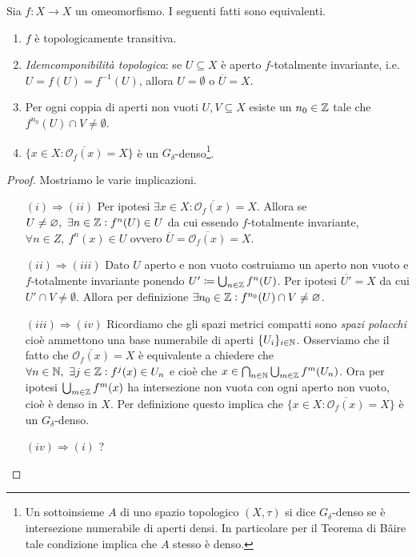 \begin{theorem}
	Sia $ f \colon X \to X $ un omeomorfismo. I seguenti fatti sono equivalenti.
	\begin{enumerate}[label=(\roman*)]
		\item $ f $ è topologicamente transitiva.
		\item \emph{Idemcomponibilità topologica}: se $ U \subseteq X $ è aperto $ f $-totalmente invariante, i.e. $ U = f(U) = f^{-1}(U) $, allora $ U = \emptyset $ o $ \overline{U} = X $.
		\item Per ogni coppia di aperti non vuoti $ U, V \subseteq X $ esiste un $ n_0 \in \mathbb{Z} $ tale che $ f^{n_0}(U) \cap V \neq \emptyset $. 
		\item $ \{x \in X : \overline{\mathcal{O}_f(x)} = X\} $ è un $ G_\delta $-denso\footnote{%
			Un sottoinsieme $ A $ di uno spazio topologico $ (X, \tau) $ si dice $ G_\delta $-denso se è intersezione numerabile di aperti densi. In particolare per il Teorema di B\^{a}ire tale condizione implica che $ A $ stesso è denso. 
		}.
	\end{enumerate}
\end{theorem}
%
\begin{proof}
	Mostriamo le varie implicazioni. 
	\begin{enumerate}
		\item[$ (i) \Rightarrow (ii) $] Per ipotesi $ \exists x \in X : \overline{\mathcal{O}_f(x)} = X $. Allora se $ U \neq \varnothing, \ \exists n \in \mathbb{Z} : f^{n}(U) \in U $ da cui essendo $ f $-totalmente invariante, $ \forall n \in Z, \ f^n(x) \in U $ ovvero $ \overline{U} = \overline{\mathcal{O}_f(x)} = X $. 
		\item[$ (ii) \Rightarrow (iii) $] Dato $ U $ aperto e non vuoto costruiamo un aperto non vuoto e $ f $-totalmente invariante ponendo $ U' \coloneqq \bigcup_{n \in \mathbb{Z}} f^n(U) $. Per ipotesi $ \overline{U'} = X $ da cui $ U' \cap V \neq \emptyset $. Allora per definizione $ \exists n_0 \in \mathbb{Z} : f^{n_0}(U) \cap V \neq \varnothing $.
		\item[$ (iii) \Rightarrow (iv) $] Ricordiamo che gli spazi metrici compatti sono \emph{spazi polacchi} cioè ammettono una base numerabile di aperti $ \{U_i\}_{i \in \mathbb{N}} $. Osserviamo che il fatto che $ \overline{\mathcal{O}_f(x)} = X $ è equivalente a chiedere che $ \forall n \in \mathbb{N}, \ \exists j \in \mathbb{Z} : f^j(x) \in U_n $ e cioè che $ x \in \bigcap_{n \in \mathbb{N}} \bigcup_{m \in \mathbb{Z}} f^{m}(U_n) $. Ora per ipotesi $ \bigcup_{m \in \mathbb{Z}} f^m(x) $ ha intersezione non vuota con ogni aperto non vuoto, cioè è denso in $ X $. Per definizione questo implica che $ \{x \in X : \overline{\mathcal{O}_f(x)} = X\} $ è un $ G_\delta $-denso. 
		\item[$ (iv) \Rightarrow (i) $] ?
	\end{enumerate}
\end{proof}

